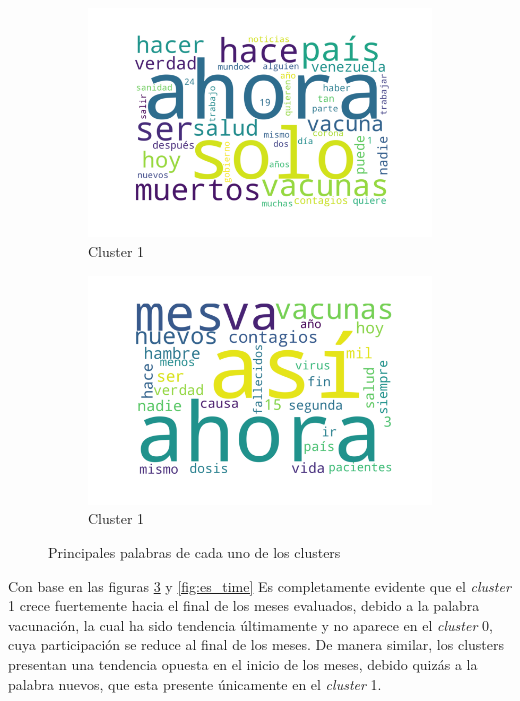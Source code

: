 \begin{figure}
\begin{subfigure}[b]{0.75\textwidth}
        \includegraphics[width=\textwidth]{results/TopicDetection/es/cluster2.png}
        \caption{Cluster 1}
        \label{fig:es_c1}
    \end{subfigure}
    \hfill
    \begin{subfigure}[b]{0.75\textwidth}
        \centering
        \includegraphics[width=\textwidth]{results/TopicDetection/es/cluster3.png}
        \caption{Cluster 1}
        \label{fig:es_c1}
    \end{subfigure}
    \caption{Principales palabras de cada uno de los clusters}
    \label{fig:es_clusters}
\end{figure}

Con base en las figuras \ref{fig:es_clusters} y \ref{fig:es_time} Es completamente evidente que el \textit{cluster} 1 crece fuertemente hacia el final de los meses evaluados, debido a la palabra vacunación, la cual ha sido tendencia últimamente y no aparece en el \textit{cluster} 0, cuya participación se reduce al final de los meses. De manera similar, los clusters presentan una tendencia opuesta en el inicio de los meses, debido quizás a la palabra nuevos, que esta presente únicamente en el \textit{cluster} 1.

